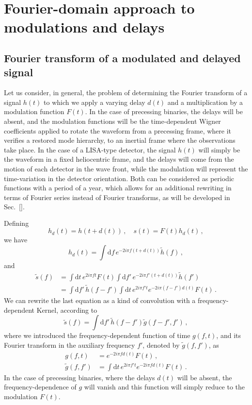 \documentclass[aps,showpacs,%
prd,superscriptaddress,nofootinbib]{revtex4}
\newcommand{\be}{\begin{equation}}
\newcommand{\ee}{\end{equation}}
\newcommand\ud{{\mathrm{d}}}
\newcommand{\nn}{\nonumber}
\begin{document}

\section{Fourier-domain approach to modulations and delays}
\label{sec:formalism}


\subsection{Fourier transform of a modulated and delayed signal}
\label{subsec:FTgeneral}

Let us consider, in general, the problem of determining the Fourier transform of a signal $h(t)$ to which we apply a varying delay $d(t)$ and a multiplication by a modulation function $F(t)$. In the case of precessing binaries, the delays will be absent, and the modulation functions will be the time-dependent Wigner coefficients applied to rotate the waveform from a precessing frame, where it verifies a restored mode hierarchy, to an inertial frame where the observations take place. In the case of a LISA-type detector, the signal $h(t)$ will simply be the waveform in a fixed heliocentric frame, and the delays will come from the motion of each detector in the wave front, while the modulation will represent the time-variation in the detector orientation. Both can be considered as periodic functions with a period of a year, which allows for an additional rewriting in terms of Fourier series instead of Fourier transforms, as will be developed in Sec.~\ref{}. 

Defining
%
\be
	h_{d}(t) = h(t+d(t)) \,, \quad s(t) = F(t)h_{d}(t) \,,
\ee
%
we have
%
\be
	h_{d}(t) = \int \ud f \, e^{-2i\pi f (t+d(t))}\tilde{h}(f) \,,
\ee
%
and
%
\begin{align}
	\tilde{s}(f) &= \int \ud t \, e^{2i\pi f t} F(t)  \int \ud f' \, e^{-2i\pi f' (t+d(t))}\tilde{h}(f') \nn\\
	&= \int \ud f' \, \tilde{h}(f-f') \int \ud t \, e^{2i\pi f' t} e^{-2i\pi (f-f') d(t)} F(t) \,.
\end{align}
%
We can rewrite the last equation as a kind of convolution with a frequency-dependent Kernel, according to
%
\be\label{eq:FDkernel}
	\tilde{s}(f) = \int \ud f' \, \tilde{h}(f-f') \tilde{g}(f-f',f') \,,
\ee
%
where we introduced the frequency-dependent function of time $g(f,t)$, and its Fourier transform in the auxiliary frequency $f'$, denoted by $\tilde{g}(f,f')$, as
%
\begin{subequations}\label{eq:defg}
\begin{align}
	g(f,t) &= e^{-2i\pi f d(t)} F(t) \,, \\
	\tilde{g}(f,f') &= \int \ud t \, e^{2i\pi f' t} e^{-2i\pi f d(t)} F(t) \,.
\end{align}
\end{subequations}
%
In the case of precessing binaries, where the delays $d(t)$ will be absent, the frequency-dependence of $g$ will vanish and this function will simply reduce to the modulation $F(t)$.
\end{document}
